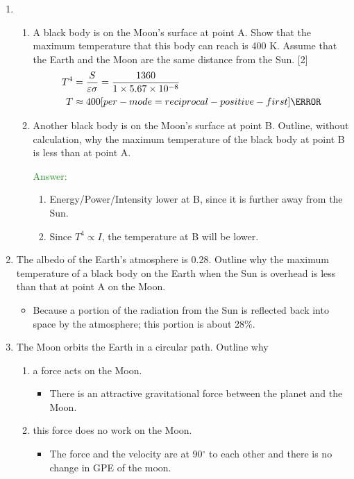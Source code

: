 \documentclass[a4paper,12pt]{article}
\let\oldsi\si
\renewcommand{\si}[1]{\oldsi[per-mode=reciprocal-positive-first]{#1}}
\newcommand{\degsym}{^{\circ}}
\begin{document}
\begin{enumerate}[label=(\alph*)]
  \item \begin{enumerate}[label=(\roman*)]
          \item A black body is on the Moon’s surface at point A. Show that the maximum
                temperature that this body can reach is 400 K. Assume that the Earth and the
                Moon are the same distance from the Sun. [2]
                \begin{align*}
                  T^4 & = \frac{S}{\varepsilon \sigma} = \frac{1360}{1 \times 5.67 \times 10^{-8}} \\
                  T   & \approx 400 \si{\K}
                \end{align*}
          \item Another black body is on the Moon's surface at point B. Outline, without calculation, why the maximum temperature of the black body at point B is less than at point A.

                \textcolor{ForestGreen}{Answer:} \begin{enumerate}
                  \item Energy/Power/Intensity lower at B, since it is further away from the Sun.

                  \item Since $T^4 \propto I$, the temperature at B will be lower.
                \end{enumerate}
        \end{enumerate}
  \item The albedo of the Earth's atmosphere is 0.28. Outline why the maximum temperature of a black body on the Earth when the Sun is overhead is less than that at point A on the Moon.
        \begin{itemize}
          \item Because a portion of the radiation from the Sun is reflected back into space by the atmosphere; this portion is about 28\%.
        \end{itemize}
  \item The Moon orbits the Earth in a circular path.
        Outline why
        \begin{enumerate}[label=(\roman*)]
          \item a force acts on the Moon.
                \begin{itemize}
                  \item There is an attractive gravitational force between the planet and the Moon.
                \end{itemize}
          \item this force does no work on the Moon.
                \begin{itemize}
                  \item The force and the velocity are at 90$\degsym$ to each other and there is no change in GPE of the moon.
                \end{itemize}
        \end{enumerate}
\end{enumerate}
\end{document}
